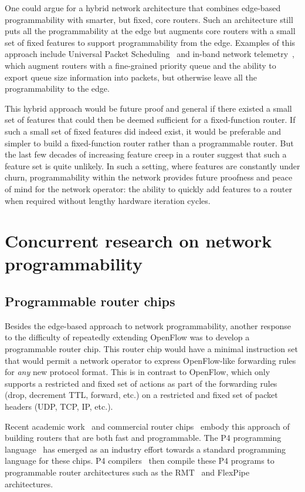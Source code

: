 One could argue for a hybrid network architecture that combines edge-based
programmability with smarter, but fixed, core routers. Such an architecture
still puts all the programmability at the edge but augments core routers with a
small set of fixed features to support programmability from the edge.  Examples
of this approach include Universal Packet Scheduling~\cite{ups} and in-band
network telemetry~\cite{int, int_paper}, which augment routers with a
fine-grained priority queue and the ability to export queue size information
into packets, but otherwise leave all the programmability to the edge.

This hybrid approach would be future proof and general if there existed a small
set of features that could then be deemed sufficient for a fixed-function
router. If such a small set of fixed features did indeed exist, it would be
preferable and simpler to build a fixed-function router rather than a
programmable router. But the last few decades of increasing feature creep in a
router suggest that such a feature set is quite unlikely. In such a setting,
where features are constantly under churn, programmability within the network
provides future proofness and peace of mind for the network operator: the
ability to quickly add features to a router when required without lengthy
hardware iteration cycles.

\section{Concurrent research on network programmability}
\label{s:concurrent}

\subsection{Programmable router chips}
\label{ss:prog_router_chips}
Besides the edge-based approach to network programmability, another response to
the difficulty of repeatedly extending OpenFlow was to develop a programmable
router chip. This router chip would have a minimal instruction set that would
permit a network operator to express OpenFlow-like forwarding rules for {\em
any} new protocol format. This is in contrast to OpenFlow, which only supports
a restricted and fixed set of actions as part of the forwarding rules (drop,
decrement TTL, forward, etc.) on a restricted and fixed set of packet headers
(UDP, TCP, IP, etc.).

Recent academic work~\cite{rmt} and commercial router chips~\cite{tofino,
flexpipe, xpliant} embody this approach of building routers that are both fast
and programmable. The P4 programming language~\cite{p4} has emerged as an
industry effort towards a standard programming language for these chips.  P4
compilers~\cite{lavanya_compiler} then compile these P4 programs to
programmable router architectures such as the RMT~\cite{rmt} and
FlexPipe~\cite{flexpipe} architectures.

